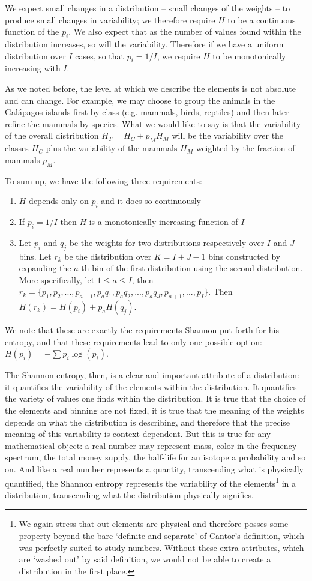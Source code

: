 \documentclass{article}
\begin{document}
We  expect small changes in a distribution -- small changes of the weights -- to produce small changes in variability; we therefore require $H$ to be a continuous function of the $p_i$. We also expect that as the number of values found within the distribution increases, so will the variability. Therefore if we have a uniform distribution over $I$ cases, so that $p_i = 1/I$, we require $H$ to be monotonically increasing with $I$.

As we noted before, the level at which we describe the elements is not absolute and can change. For example, we may choose to group the animals in the Gal\'{a}pagos islands first by class (e.g. mammals, birds, reptiles) and then later refine the mammals by species. What we would like to say is that the variability of the overall distribution $H_T = H_C + p_M H_M$ will be the variability over the classes $H_C$ plus the variability of the mammals $H_M$ weighted by the fraction of mammals $p_M$.

To sum up, we have the following three requirements:
\begin{enumerate}
\item $H$ depends only on $p_i$ and it does so continuously
\item If $p_i=1/I$ then $H$ is a monotonically increasing function of $I$
\item Let $p_i$ and $q_j$ be the weights for two distributions respectively over $I$ and $J$ bins. Let $r_k$ be the distribution over $K=I+J-1$ bins constructed by expanding the $a$-th bin of the first distribution using the second distribution. More specifically, let $1 \leq a \leq I$, then $r_k = \{p_1, p_2, ..., p_{a-1}, p_{a}q_1, p_{a}q_2, ..., p_{a}q_J, p_{a+1}, ..., p_I \}$. Then $H(r_k) = H(p_i) + p_{a} H(q_j)$.
\end{enumerate}

We note that these are exactly the requirements Shannon put forth for his entropy\cite{Shannon}, and that these requirements lead to only one possible option: $H(p_i) = - \sum p_i \log(p_i)$.

The Shannon entropy, then, is a clear and important attribute of a distribution: it quantifies the variability of the elements within the distribution. It quantifies the variety of values one finds within the distribution. It is true that the choice of the elements and binning are not fixed, it is true that the meaning of the weights depends on what the distribution is describing, and therefore that the precise meaning of this variability is context dependent. But this is true for any mathematical object: a real number may represent mass, color in the frequency spectrum, the total money supply, the half-life for an isotope a probability and so on. And like a real number represents a quantity, transcending what is physically quantified, the Shannon entropy represents the variability of the elements\footnote{We again stress that out elements are physical and therefore posses some property beyond the bare `definite and separate' of Cantor's definition, which was perfectly suited to study numbers. Without these extra attributes, which are `washed out' by said definition, we would not be able to create a distribution in the first place.} in a distribution, transcending what the distribution physically signifies.
\end{document}
